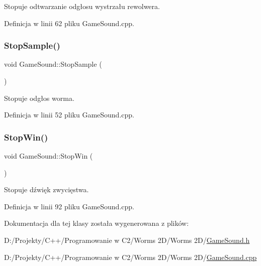 Stopuje odtwarzanie odgłosu wystrzału rewolwera. 



Definicja w linii 62 pliku Game\+Sound.\+cpp.

\mbox{\label{class_game_sound_a819246ab2ca8154f7b8fa1b87cdd68ca}} 
\subsubsection{\texorpdfstring{Stop\+Sample()}{StopSample()}}
{\footnotesize\ttfamily void Game\+Sound\+::\+Stop\+Sample (\begin{DoxyParamCaption}{ }\end{DoxyParamCaption})}



Stopuje odgłos worma. 



Definicja w linii 52 pliku Game\+Sound.\+cpp.

\mbox{\label{class_game_sound_a1001607a8791e3000aff36fcc2d949f3}} 
\subsubsection{\texorpdfstring{Stop\+Win()}{StopWin()}}
{\footnotesize\ttfamily void Game\+Sound\+::\+Stop\+Win (\begin{DoxyParamCaption}{ }\end{DoxyParamCaption})}



Stopuje dźwięk zwycięstwa. 



Definicja w linii 92 pliku Game\+Sound.\+cpp.



Dokumentacja dla tej klasy została wygenerowana z plików\+:\begin{DoxyCompactItemize}
\item 
D\+:/\+Projekty/\+C++/\+Programowanie w C2/\+Worms 2\+D/\+Worms 2\+D/\mbox{\hyperlink{_game_sound_8h}{Game\+Sound.\+h}}\item 
D\+:/\+Projekty/\+C++/\+Programowanie w C2/\+Worms 2\+D/\+Worms 2\+D/\mbox{\hyperlink{_game_sound_8cpp}{Game\+Sound.\+cpp}}\end{DoxyCompactItemize}
